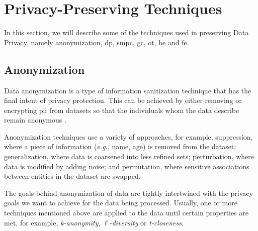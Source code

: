 \section{Privacy-Preserving Techniques}
\label{sec:PrivacyPreservingTechniques}


 In this section, we will describe some of the techniques used in preserving Data Privacy, namely anonymization, \ac{dp}, \ac{smpc}, \ac{gc}, \ac{ot}, \ac{he} and \ac{fe}.


\subsection{Anonymization}
\label{ssec:Anonymization}


Data anonymization is a type of information sanitization technique that has the final intent of privacy protection. This can be achieved by either removing or encrypting \ac{pii} from datasets so that the individuals whom the data describe remain anonymous \cite{raghunathan2013}.

Anonymization techniques use a variety of approaches, for example, suppression, where a piece of information (\textit{e.g.}, name, age) is removed from the dataset; generalization, where data is coarsened into less refined sets; perturbation, where data is modified by adding noise; and permutation, where sensitive associations between entities in the dataset are swapped.

The goals behind anonymization of data are tightly intertwined with the privacy goals we want to achieve for the data being processed. Usually, one or more techniques mentioned above are applied to the data until certain properties are met, for example, \textit{k-anonymity}, $\ell$\textit{-diversity} or \textit{t-closeness}.

